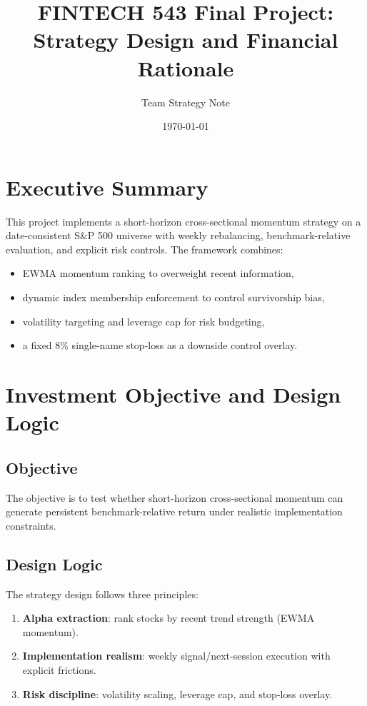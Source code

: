 \documentclass[11pt]{article}
\title{FINTECH 543 Final Project: Strategy Design and Financial Rationale}
\author{Team Strategy Note}
\date{\today}
\begin{document}
\maketitle

\section{Executive Summary}
This project implements a short-horizon cross-sectional momentum strategy on a date-consistent S\&P 500 universe with weekly rebalancing, benchmark-relative evaluation, and explicit risk controls. The framework combines:
\begin{itemize}[leftmargin=1.5em]
    \item EWMA momentum ranking to overweight recent information,
    \item dynamic index membership enforcement to control survivorship bias,
    \item volatility targeting and leverage cap for risk budgeting,
    \item a fixed 8\% single-name stop-loss as a downside control overlay.
\end{itemize}

\section{Investment Objective and Design Logic}
\subsection{Objective}
The objective is to test whether short-horizon cross-sectional momentum can generate persistent benchmark-relative return under realistic implementation constraints.

\subsection{Design Logic}
The strategy design follows three principles:
\begin{enumerate}[leftmargin=1.5em]
    \item \textbf{Alpha extraction}: rank stocks by recent trend strength (EWMA momentum).
    \item \textbf{Implementation realism}: weekly signal/next-session execution with explicit frictions.
    \item \textbf{Risk discipline}: volatility scaling, leverage cap, and stop-loss overlay.
\end{enumerate}
\end{document}
